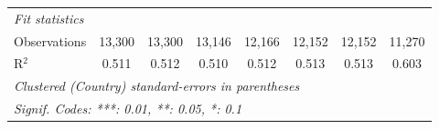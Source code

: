 \begin{tabular}{lccccccc}
   \midrule \emph{Fit statistics}\\
   Observations                                                  & 13,300         & 13,300         & 13,146        & 12,166        & 12,152        & 12,152        & 11,270\\  
   R$^2$                                                         & 0.511          & 0.512          & 0.510         & 0.512         & 0.513         & 0.513         & 0.603\\  
   \midrule
   \multicolumn{8}{l}{\emph{Clustered (Country) standard-errors in parentheses}}\\
   \multicolumn{8}{l}{\emph{Signif. Codes: ***: 0.01, **: 0.05, *: 0.1}}\\
\end{tabular}
\par\endgroup


